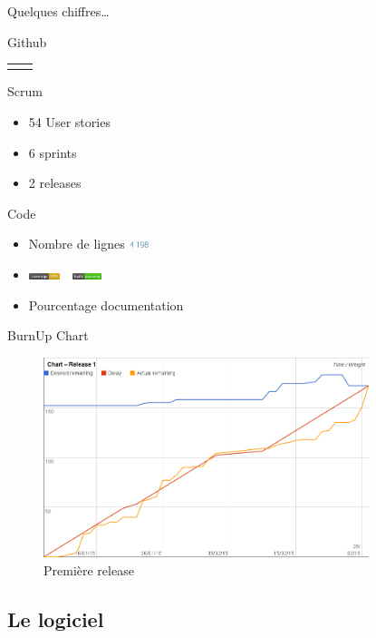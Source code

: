 \begin{frame}{Quelques chiffres\ldots}
\begin{block}{Github}
\begin{tabular}{cc}
\begin{minipage}{0.5\textwidth}
					\end{minipage}
				\end{tabular}
			\end{block}
			\pause
			\begin{block}{Scrum}
				\begin{itemize}
					\item 54 User stories
					\item 6 sprints
					\item 2 releases
				\end{itemize}
			\end{block}
			\pause
			\begin{block}{Code}
				\begin{itemize}
					\item Nombre de lignes \includegraphics[height=9px]{images/stats/nblines.jpg}
					\item \includegraphics[height=7px]{images/coverage.png}~~\includegraphics[height=7px]{images/build.png}
					\item Pourcentage documentation
				\end{itemize}
			\end{block}

		\end{frame}

		\begin{frame}{BurnUp Chart}
			\begin{figure}[H]
				\includegraphics[width=9.5cm]{images/release1Chart.png}
				\caption{Première release}
			\end{figure}
		\end{frame}

		\subsection{Le logiciel}
		\begin{frame}
			\end{frame}

